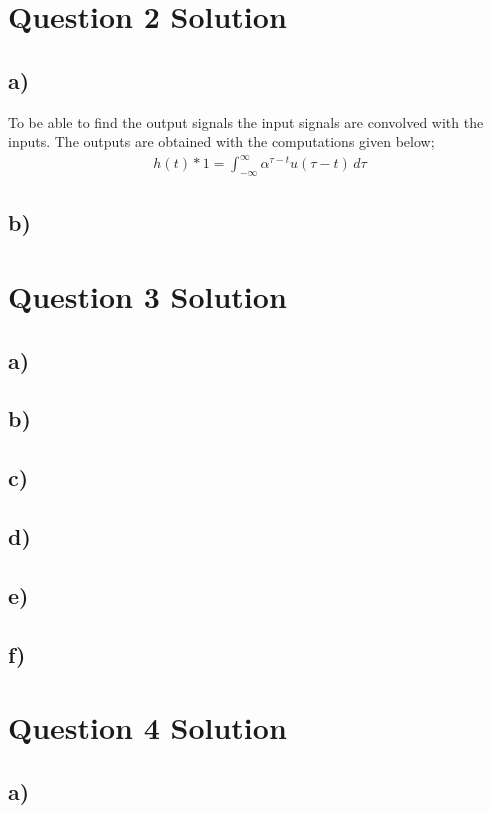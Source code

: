 \documentclass[letterpaper,12pt]{article}
\begin{document}
\section{Question 2 Solution}
\subsection{a)}
To be able to find the output signals the input signals are convolved with the inputs. The outputs are obtained with the computations given below;
\begin{equation}
    \begin{split}
        h(t) \ast 1 = \int_{-\infty}^{\infty} \alpha^{\tau-t} u(\tau-t)  \,d\tau  
    \end{split}
\end{equation}
\subsection{b)}
\section{Question 3 Solution}
\subsection{a)}
\subsection{b)}
\subsection{c)}
\subsection{d)}
\subsection{e)}
\subsection{f)}

\section{Question 4 Solution}
\subsection{a)}
\end{document}
